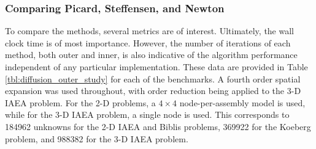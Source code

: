 \subsubsection{Comparing Picard, Steffensen, and Newton}
\label{sec:global_solver_diffusion}

To compare the methods, several metrics are of interest.  Ultimately, the 
wall clock time is of most importance.  However, the number of iterations 
of each method, both outer and inner, is also indicative of the 
algorithm performance independent of any particular implementation.
These data are provided in Table \ref{tbl:diffusion_outer_study} 
for each of the benchmarks. A fourth
order spatial expansion  was used throughout, with order reduction being 
applied to the 3-D IAEA problem.  For the 2-D problems, a $4\times 4$ 
node-per-assembly model is used, while for the 3-D IAEA problem,  
a single node is used.  This corresponds to 184962 unknowns for the 
2-D IAEA and Biblis problems, 369922 for the Koeberg problem, 
and 988382 for the 3-D IAEA problem.

